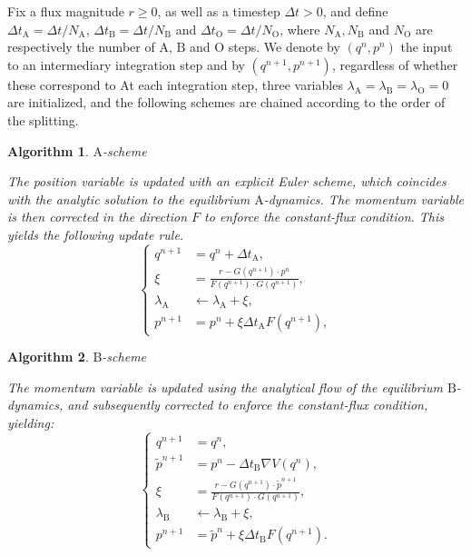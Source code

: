 \documentclass[pdflatex,sn-mathphys]{sn-jnl}%
\theoremstyle{thmstyleone}%
\theoremstyle{thmstyletwo}%
\newtheorem{algorithm}{Algorithm}
\theoremstyle{thmstylethree}%
\newcommand{\1}{\mathbbm{1}}
\begin{document}
Fix a flux magnitude $r\geq 0$, as well as a timestep $\Delta t>0$, and define $\Delta t_{\mathrm{A}}=\Delta t / N_{\mathrm{A}}$, $\Delta t_{\mathrm{B}}=\Delta t / N_{\mathrm{B}}$ and $\Delta t_{\mathrm{O}}=\Delta t / N_{\mathrm{O}}$, where $N_{\mathrm{A}},N_{\mathrm{B}}$ and $N_{\mathrm{O}}$ are respectively the number of $\mathrm{A}$, $\mathrm{B}$ and $\mathrm{O}$ steps.
We denote by $(q^n,p^n)$ the input to an intermediary integration step and by $(q^{n+1},p^{n+1})$, regardless of whether these correspond to 
At each integration step, three variables $\lambda_{\mathrm{A}} = \lambda_{\mathrm{B}} = \lambda_{\mathrm{O}} = 0$ are initialized, and the following schemes are chained according to the order of the splitting.

\begin{algorithm}
    \caption{$\mathrm{A}$-scheme}
    The position variable is updated with an explicit Euler scheme, which coincides with the analytic solution to the equilibrium $\mathrm{A}$-dynamics. The momentum variable is then corrected in the direction $F$ to enforce the constant-flux condition. This yields the following update rule.
\begin{equation}
\left\{\begin{aligned}
    q^{n+1} &= q^n +\Delta t_{\mathrm{A}},\\
    \xi &= \frac{r-G(q^{n+1})\cdot p^n}{F(q^{n+1})\cdot G(q^{n+1})},\\
    \lambda_{\mathrm{A}} &\gets \lambda_{\mathrm{A}} + \xi,\\
    p^{n+1} &= p^n + \xi\Delta t_{\mathrm{A}} F(q^{n+1}),
\end{aligned}\right.
\end{equation}
\end{algorithm}

\begin{algorithm}
\caption{$\mathrm{B}$-scheme}
The momentum variable is updated using the analytical flow of the equilibrium $\mathrm{B}$-dynamics, and subsequently corrected to enforce the constant-flux condition, yielding:
\begin{equation}
\left\{\begin{aligned}
    q^{n+1} &= q^n,\\
    \widetilde{p}^{n+1}&=p^n -\Delta t_{\mathrm{B}}\nabla V(q^n),\\
    \xi &= \frac{r-G(q^{n+1})\cdot \widetilde{p}^{n+1}}{F(q^{n+1})\cdot G(q^{n+1})},\\
    \lambda_{\mathrm{B}} &\gets \lambda_{\mathrm{B}} + \xi,\\
    p^{n+1} &= \widetilde{p}^n + \xi\Delta t_{\mathrm{B}} F(q^{n+1}).
\end{aligned}\right.
\end{equation}
\end{algorithm}
\end{document}

